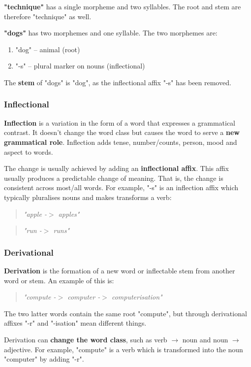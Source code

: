 \documentclass{article}
\begin{document}
\textbf{"technique"} has a single morpheme and two syllables. The root and stem are therefore "technique" as well.

\textbf{"dogs"} has two morphemes and one syllable. The two morphemes are:
\begin{enumerate}
	\item "dog" -- animal (root)
	\item "-s" -- plural marker on nouns (inflectional)
\end{enumerate}
 The \textbf{stem} of "dogs" is "dog", as the inflectional affix "-s" has been removed.
 
\subsubsection{Inflectional}

\textbf{Inflection} is a variation in the form of a word that expresses a grammatical contrast. It doesn't change the word class but causes the word to serve a \textbf{new grammatical role}. Inflection adds tense, number/counts, person, mood and aspect to words.

The change is usually achieved by adding an \textbf{inflectional affix}. This affix usually produces a predictable change of meaning. That is, the change is consistent across most/all words. For example, "-s" is an inflection affix which typically pluralises nouns and makes transforms a verb:
\begin{quote}
	\textit{"apple -$>$ apples"}
\end{quote}
\begin{quote}
	\textit{"run -$>$ runs"}
\end{quote}

\subsubsection{Derivational}

\textbf{Derivation} is the formation of a new word or inflectable stem from another word or stem. An example of this is:
\begin{quote}
	\textit{"compute -$>$ computer -$>$ computerisation"}
\end{quote}
The two latter words contain the same root "compute", but through derivational affixes "-r" and "-isation" mean different things.

Derivation can \textbf{change the word class}, such as verb $\rightarrow$ noun and noun $\rightarrow$ adjective. For example, "compute" is a verb which is transformed into the noun "computer" by adding "-r".
\end{document}
